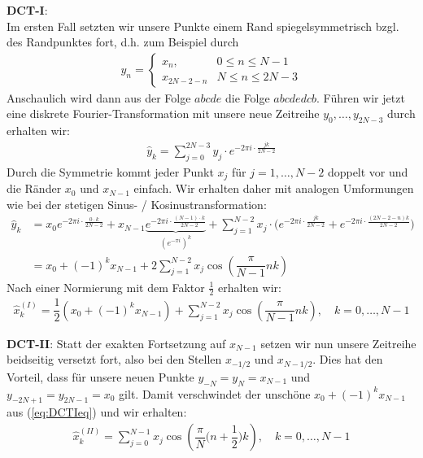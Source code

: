 \textbf{DCT-I}: \\
Im ersten Fall setzten wir unsere Punkte einem Rand spiegelsymmetrisch bzgl. des Randpunktes fort, d.h. 
zum Beispiel durch 
%
\begin{align*}
  y_{n} = \begin{cases}
    x_n, & 0\leq n\leq N-1 \\
    x_{2N-2-n} & N \leq n \leq 2N-3
  \end{cases}
\end{align*}
%
Anschaulich wird dann aus der Folge $abcde$ die Folge $abcdedcb$. Führen wir jetzt eine \grqq{} 
diskrete Fourier-Transformation mit unsere neue Zeitreihe 
$y_0,\dots,y_{2N-3}$ durch erhalten wir:
%
\begin{align*}
  \hat{y}_{k} 
  = \sum_{j=0}^{2N-3} y_j\cdot e^{-2\pi i\cdot \tfrac{jk}{2N-2}} 
\end{align*}
%
Durch die Symmetrie kommt jeder Punkt $x_j$ für $j=1,\dots,N-2$ doppelt vor und die Ränder $x_0$ und $x_{N-1}$ einfach.
Wir erhalten daher mit analogen Umformungen wie bei der stetigen Sinus- / Kosinustransformation:
%
\begin{align*}
  \hat{y}_{k} 
  &= x_0 e^{-2\pi i\cdot \tfrac{0\cdot k}{2N-2}} + x_{N-1} \underbrace{e^{-2\pi i\cdot \tfrac{(N-1)\cdot k}{2N-2}}}_{(e^{-\pi i})^k}
  + \sum_{j=1}^{N-2} x_j\cdot \Big(e^{-2\pi i\cdot \tfrac{jk}{2N-2}} + e^{-2\pi i\cdot \tfrac{(2N-2-n)k}{2N-2}} \Big) \\
  &= x_0 + (-1)^kx_{N-1} + 2\sum_{j=1}^{N-2} x_j \cos\left(\dfrac{\pi}{N-1}nk\right)
\end{align*} 
%
Nach einer Normierung mit dem Faktor $\tfrac{1}{2}$ erhalten wir:
%
\begin{align*}
  \hat{x}^{(I)}_k 
  = \dfrac{1}{2}\left(x_0 + (-1)^kx_{N-1}\right) + \sum_{j=1}^{N-2} x_j \cos\left(\dfrac{\pi}{N-1}nk\right), 
  \quad k=0,\dots,N-1
  \tag{I}\label{eq:DCTIeq}
\end{align*}
%

\textbf{DCT-II}:
Statt der exakten Fortsetzung auf $x_{N-1}$ setzen wir nun unsere Zeitreihe beidseitig versetzt fort, also bei den  
Stellen $x_{-1/2}$ und $x_{N-1/2}$. Dies hat den Vorteil, dass für unsere neuen Punkte $y_{-N}=y_{N}=x_{N-1}$ und 
$y_{-2N+1}=y_{2N-1}=x_0$ gilt. 
Damit verschwindet der unschöne $x_0 + (-1)^kx_{N-1}$ aus (\ref{eq:DCTIeq}) und wir erhalten:
%
\begin{align*}
  \hat{x}^{(II)}_k 
  = \sum_{j=0}^{N-1} x_j \cos\left(\dfrac{\pi}{N}\Big(n+\dfrac{1}{2}\Big)k\right), 
  \quad k=0,\dots,N-1
  \tag{II}\label{eq:DCTIIeq}
\end{align*}
%

